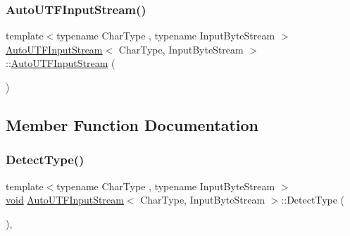 \subsubsection{\texorpdfstring{Auto\+U\+T\+F\+Input\+Stream()}{AutoUTFInputStream()}\hspace{0.1cm}{\footnotesize\ttfamily [2/2]}}
{\footnotesize\ttfamily template$<$typename Char\+Type , typename Input\+Byte\+Stream $>$ \\
\hyperlink{classAutoUTFInputStream}{Auto\+U\+T\+F\+Input\+Stream}$<$ Char\+Type, Input\+Byte\+Stream $>$\+::\hyperlink{classAutoUTFInputStream}{Auto\+U\+T\+F\+Input\+Stream} (\begin{DoxyParamCaption}\item[{const \hyperlink{classAutoUTFInputStream}{Auto\+U\+T\+F\+Input\+Stream}$<$ Char\+Type, Input\+Byte\+Stream $>$ \&}]{ }\end{DoxyParamCaption})\hspace{0.3cm}{\ttfamily [private]}}



\subsection{Member Function Documentation}
\mbox{\label{classAutoUTFInputStream_ae7ec4841acf560cdaee9204d6ad5dec8}} 
\subsubsection{\texorpdfstring{Detect\+Type()}{DetectType()}}
{\footnotesize\ttfamily template$<$typename Char\+Type , typename Input\+Byte\+Stream $>$ \\
\hyperlink{imgui__impl__opengl3__loader_8h_ac668e7cffd9e2e9cfee428b9b2f34fa7}{void} \hyperlink{classAutoUTFInputStream}{Auto\+U\+T\+F\+Input\+Stream}$<$ Char\+Type, Input\+Byte\+Stream $>$\+::Detect\+Type (\begin{DoxyParamCaption}{ }\end{DoxyParamCaption})\hspace{0.3cm}{\ttfamily [inline]}, {\ttfamily [private]}}

\mbox{\label{classAutoUTFInputStream_aecc08f52794d761fc1b729907a83dcf8}} 
